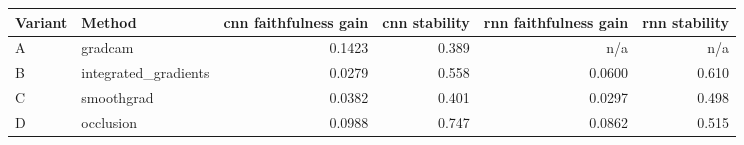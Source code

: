 \begin{tabular}{llrrrr}
\toprule
Variant & Method & cnn faithfulness gain & cnn stability & rnn faithfulness gain & rnn stability \\
\midrule
A & gradcam & 0.1423 & 0.389 & n/a & n/a \\
B & integrated\_gradients & 0.0279 & 0.558 & 0.0600 & 0.610 \\
C & smoothgrad & 0.0382 & 0.401 & 0.0297 & 0.498 \\
D & occlusion & 0.0988 & 0.747 & 0.0862 & 0.515 \\
\bottomrule
\end{tabular}
